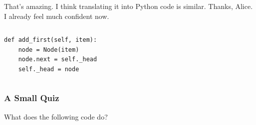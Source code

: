\documentclass[aspectratio=169, 14pt]{beamer}
\begin{document}
\begin{frame}[fragile]
    \begin{leftbubbles}
That's amazing. I think translating it into Python code is similar. Thanks, Alice. I already feel much confident now.
    \end{leftbubbles}
 
\begin{columns}
\begin{verbatim}
def add_first(self, item):
    node = Node(item)
    node.next = self._head
    self._head = node
\end{verbatim}
\end{columns}

\end{frame}

\begin{frame}
\frametitle{A Small Quiz}
{\large {}} What does the following code do?
\end{frame}
\end{document}
